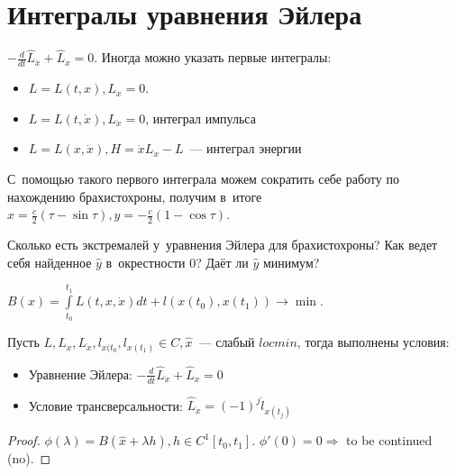 \documentclass{article}
\begin{document}
\section{Интегралы уравнения Эйлера}

$-\frac{d}{dt}\hat{L}_{\dot{x}} + \hat{L}_x = 0$. Иногда можно указать первые
интегралы:
\begin{itemize}
	\item $L = L(t, x), L_x = 0$.
	\item $L = L(t, \dot{x}), L_{\dot{x}} = 0$, интеграл импульса
	\item $L = L(x, \dot{x}), H = \dot{x}L_{\dot{x}} - L$~--- интеграл энергии
\end{itemize}

С~помощью такого первого интеграла можем сократить себе работу по нахождению
брахистохроны, получим в~итоге $x = \frac{c}{2}(\tau - \sin\tau), y =
-\frac{c}{2} (1 - \cos \tau)$.

\begin{exercise}
	Сколько есть экстремалей у~уравнения Эйлера для брахистохроны? Как ведет себя
	найденное $\hat{y}$ в~окрестности 0? Даёт ли $\hat{y}$ минимум?
\end{exercise}

\begin{problem}
	$B(x) = \int\limits_{t_0}^{t_1} L(t, x, \dot{x}) dt + l(x(t_0), x(t_1))
	\rightarrow \min$.
\end{problem}

\begin{theorem}
	Пусть $L, L_x, L_{\dot{x}}, l_{x(t_0}, l_{x(t_1)} \in C, \hat{x}$~--- слабый
	$locmin$, тогда выполнены условия:
	\begin{itemize}
		\item Уравнение Эйлера: $-\frac{d}{dt} \hat{L}_{\dot{x}} + \hat{L}_x = 0$
		\item Условие трансверсальности: $\hat{L}_{\dot{x}} =
			(-1)^j \hat{l}_{x(t_j)}$
	\end{itemize}
\end{theorem}
\begin{proof}
	$\phi(\lambda) = B(\hat{x} + \lambda h), h \in C^1[t_0, t_1]$. $\phi'(0) = 0
	\Rightarrow $ to be continued (no).
\end{proof}
\end{document}
